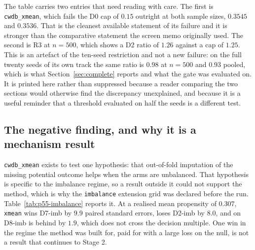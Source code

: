 The table carries two entries that need reading with care. The first is
\texttt{cwdb\_xmean}, which fails the D0 cap of $0.15$ outright at both sample
sizes, $0.3545$ and $0.3536$. That is the cleanest available statement of its
failure and it is stronger than the comparative statement the screen memo
originally used. The second is R3 at $n = 500$, which shows a D2 ratio of
$1.26$ against a cap of $1.25$. This is an artefact of the ten-seed restriction
and not a new failure: on the full twenty seeds of its own track the same ratio
is $0.98$ at $n = 500$ and $0.93$ pooled, which is what
Section~\ref{sec:complete} reports and what the gate was evaluated on. It is
printed here rather than suppressed because a reader comparing the two sections
would otherwise find the discrepancy unexplained, and because it is a useful
reminder that a threshold evaluated on half the seeds is a different test.

\subsection{The negative finding, and why it is a mechanism result}

\texttt{cwdb\_xmean} exists to test one hypothesis: that out-of-fold imputation
of the missing potential outcome helps when the arms are unbalanced. That
hypothesis is specific to the imbalance regime, so a result outside it could not
support the method, which is why the \texttt{imbalance} extension grid was
declared before the run. Table~\ref{tab:p55-imbalance} reports it. At a realised
mean propensity of $0.307$, \texttt{xmean} wins D7-imb by $9.9$ paired standard
errors, loses D2-imb by $8.0$, and on D8-imb is behind by $1.9$, which does not
cross the decision multiple. One win in the regime the method was built for,
paid for with a large loss on the null, is not a result that continues to
Stage 2.

